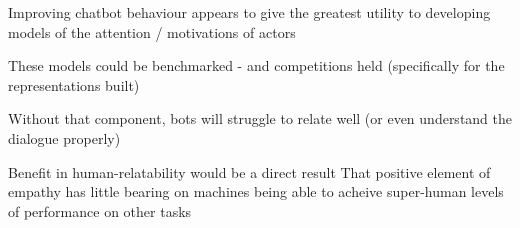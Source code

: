 \documentclass[citeauthoryear]{llncs}
\begin{document}
Improving chatbot behaviour appears to give the greatest utility to developing models of the attention / motivations of actors

  These models could be benchmarked - and competitions held (specifically for the representations built)
  
  Without that component, bots will struggle to relate well (or even understand the dialogue properly)
  
  Benefit in human-relatability would be a direct result
    That positive element of empathy has little bearing on machines being able to acheive 
    super-human levels of performance on other tasks



%
%
\begin{thebibliography}{}
%
\newcommand{\mytilde}{\raise.17ex\hbox{$\scriptstyle\mathtt{\sim}$}}









\end{thebibliography}
\end{document}
